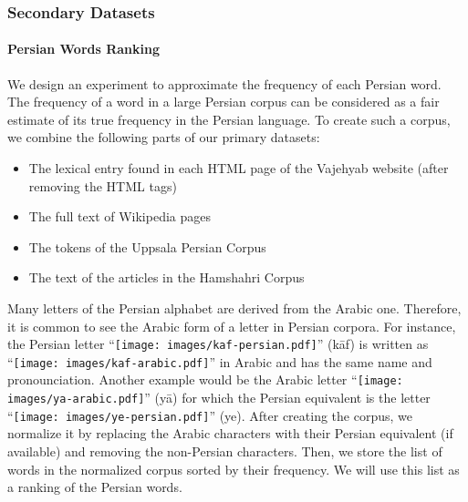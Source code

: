 \documentclass{article}
\begin{document}
\subsubsection{Secondary Datasets \label{sec:secondary-datasets}}
\paragraph{Persian Words Ranking \label{sec:words-ranking}}
We design an experiment to approximate the frequency of each Persian word. The frequency of a word in a large Persian corpus can be considered as a fair estimate of its true frequency in the Persian language. To create such a corpus, we combine the following parts of our primary datasets:
\begin{itemize}
	\item The lexical entry found in each HTML page of the Vajehyab website (after removing the HTML tags)
	\item The full text of Wikipedia pages
	\item The tokens of the Uppsala Persian Corpus
	\item The text of the articles in the Hamshahri Corpus
\end{itemize}

Many letters of the Persian alphabet are derived from the Arabic one. Therefore, it is common to see the Arabic form of a letter in Persian corpora. For instance, the Persian letter ``\texttt{[image: images/kaf-persian.pdf]}'' (kāf) is written as ``\texttt{[image: images/kaf-arabic.pdf]}'' in Arabic and has the same name and pronounciation. Another example would be the Arabic letter ``\texttt{[image: images/ya-arabic.pdf]}'' (yā) for which the Persian equivalent is the letter ``\texttt{[image: images/ye-persian.pdf]}'' (ye).
After creating the corpus, we normalize it by replacing the Arabic characters with their Persian equivalent (if available) and removing the non-Persian characters.
Then, we store the list of words in the normalized corpus sorted by their frequency. We will use this list as a ranking of the Persian words.
\end{document}
